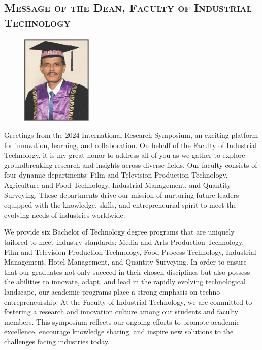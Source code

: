 \thispagestyle{fancy}
	
	\vspace{-2em} %
	\begin{center}



\subsection*{\textsc{Message of the Dean, Faculty of Industrial Technology}}
	\end{center}

   
    
    \begin{figure}
		\includegraphics[width=0.3\textwidth]{Images/DeanFIT.jpeg}
	\end{figure}
	\vspace{2em} %




	
	Greetings from the 2024 International Research Symposium, an exciting platform for innovation, learning, and collaboration. On behalf of the Faculty of Industrial Technology, it is my great honor to address all of you as we gather to explore groundbreaking research and insights across diverse fields.
Our faculty consists of four dynamic departments: Film and Television Production Technology, Agriculture and Food Technology, Industrial Management, and Quantity Surveying. These departments drive our mission of nurturing future leaders equipped with the knowledge, skills, and entrepreneurial spirit to meet the evolving needs of industries worldwide.

We provide six Bachelor of Technology degree programs that are uniquely tailored to meet industry standards: Media and Arts Production Technology, Film and Television Production Technology, Food Process Technology, Industrial Management, Hotel Management, and Quantity Surveying. In order to ensure that our graduates not only succeed in their chosen disciplines but also possess the abilities to innovate, adapt, and lead in the rapidly evolving technological landscape, our academic programs place a strong emphasis on techno-entrepreneurship. At the Faculty of Industrial Technology, we are committed to fostering a research and innovation culture among our students and faculty members. This symposium reflects our ongoing efforts to promote academic excellence, encourage knowledge sharing, and inspire new solutions to the challenges facing industries today.


